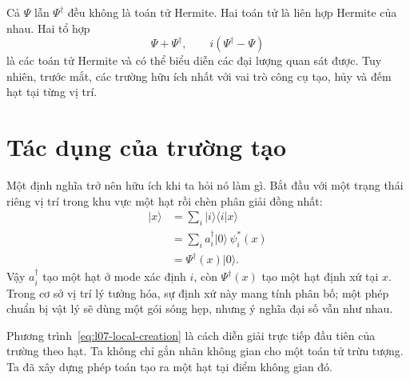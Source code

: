 Cả \(\Psi\) lẫn \(\Psi^\dagger\) đều không là toán tử Hermite. Hai toán tử là liên hợp Hermite của nhau. Hai tổ hợp
\begin{equation}
\Psi+\Psi^\dagger,
\qquad
i(\Psi^\dagger-\Psi)
\label{eq:l07-hermitian-combinations}
\end{equation}
là các toán tử Hermite và có thể biểu diễn các đại lượng quan sát được. Tuy nhiên, trước mắt, các trường hữu ích nhất với vai trò công cụ tạo, hủy và đếm hạt tại từng vị trí.

\begin{classroomqa}
\end{classroomqa}

\section{Tác dụng của trường tạo}

Một định nghĩa trở nên hữu ích khi ta hỏi nó làm gì. Bắt đầu với một trạng thái riêng vị trí trong khu vực một hạt rồi chèn phân giải đồng nhất:
\begin{align}
|x\rangle
&=\sum_i |i\rangle\langle i|x\rangle \\
&=\sum_i a_i^\dagger|0\rangle\,\psi_i^*(x) \\
&=\Psi^\dagger(x)|0\rangle.
\label{eq:l07-local-creation}
\end{align}
Vậy \(a_i^\dagger\) tạo một hạt ở mode xác định \(i\), còn \(\Psi^\dagger(x)\) tạo một hạt định xứ tại \(x\). Trong cơ sở vị trí lý tưởng hóa, sự định xứ này mang tính phân bố; một phép chuẩn bị vật lý sẽ dùng một gói sóng hẹp, nhưng ý nghĩa đại số vẫn như nhau.

\begin{classroomqa}
\end{classroomqa}

Phương trình~\eqref{eq:l07-local-creation} là cách diễn giải trực tiếp đầu tiên của trường theo hạt. Ta không chỉ gắn nhãn không gian cho một toán tử trừu tượng. Ta đã xây dựng phép toán tạo ra một hạt tại điểm không gian đó.

